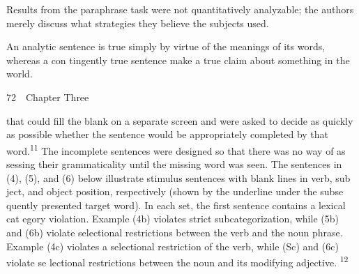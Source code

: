 \begin{listWWNumlvleveli}
\item 
\setcounter{listWWNumlvlevelii}{1}
\begin{listWWNumlvlevelii}
\item 
\setcounter{listWWNumlvleveliii}{0}
\begin{listWWNumlvleveliii}
\item 
\begin{styleStandard}
Results from the paraphrase task were not quantitatively analyzable; the authors merely discuss what strategies they believe the subjects used.
\end{styleStandard}


\item 
\begin{styleStandard}
An analytic sentence is true simply by virtue of the meanings of its words, whereas a con\- tingently true sentence make a true claim about something in the world.
\end{styleStandard}


\end{listWWNumlvleveliii}
\end{listWWNumlvlevelii}
\end{listWWNumlvleveli}
\clearpage\setcounter{page}{1}\begin{styleStandard}
72\ \ Chapter Three
\end{styleStandard}


\begin{styleStandard}
that could fill the blank on a separate screen and were asked to decide as quickly as possible whether the sentence would be {\textquotedbl}appropriately completed{\textquotedbl} by that word.\textsuperscript{11}\textsuperscript{ }The incomplete sentences were designed so that there was no way of as\- sessing their grammaticality until the missing word was seen. The sentences in (4), (5), and (6) below illustrate stimulus sentences with blank lines in verb, sub\- ject, and object position, respectively (shown by the underline under the subse\- quently presented target word). In each set, the first sentence contains a lexical cat\- egory violation. Example (4b) violates strict subcategorization, while (5b) and (6b) violate selectional restrictions between the verb and the noun phrase. Example (4c) violates a selectional restriction of the verb, while (Sc) and (6c) violate se\- lectional restrictions between the noun and its modifying adjective. \textsuperscript{12}
\end{styleStandard}


